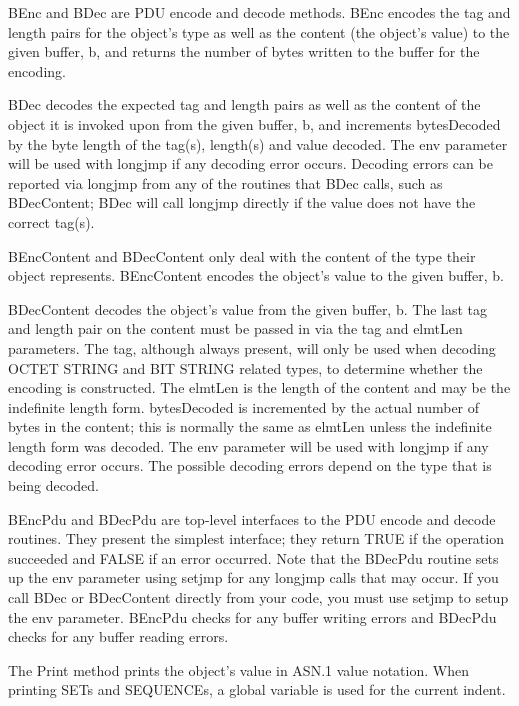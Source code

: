{\C BEnc} and {\C BDec} are PDU encode and decode methods.
{\C BEnc} encodes the tag and length pairs for the object's type as
well as the content (the object's value) to the given buffer,
{\C b}, and returns the number of bytes written to the buffer for
the encoding.

{\C BDec} decodes the expected tag and length pairs as well as the
content of the object it is invoked upon from the given buffer,
{\C b}, and increments {\C bytesDecoded}  by the byte length of
the tag(s), length(s) and value decoded.  The {\C env} parameter
will be used with {\C longjmp} if any decoding error occurs.
Decoding errors can be reported via {\C longjmp} from any of the
routines that {\C BDec} calls, such as {\C BDecContent};
{\C BDec} will call {\C longjmp} directly if the value does not
have the correct tag(s).

{\C BEncContent} and {\C BDecContent} only deal with the content
of the type their object represents.  {\C BEncContent} encodes the
object's value to the given buffer, {\C b}.

{\C BDecContent} decodes the object's value from the given buffer,
{\C b}.  The last tag and length pair on the content must be passed in
via the {\C tag} and {\C elmtLen} parameters.  The {\C tag},
although always present, will only be used when decoding OCTET STRING and
BIT STRING related types, to determine whether the encoding is
constructed.  The {\C elmtLen} is the length of the content and may
be the indefinite length form.  {\C bytesDecoded} is incremented by
the actual number of bytes in the content; this is normally the same
as {\C elmtLen} unless the indefinite length form was decoded.  The
{\C env} parameter will be used with {\C longjmp} if any decoding
error occurs.  The possible decoding errors depend on the type that is
being decoded.

{\C BEncPdu} and {\C BDecPdu} are top-level interfaces to the PDU
encode and decode routines.  They present the simplest interface;
they return TRUE if the operation succeeded and FALSE if an error
occurred.   Note that the {\C BDecPdu} routine sets up the
{\C env} parameter using {\C setjmp} for any {\C longjmp} calls
that may occur.  If you call {\C BDec} or {\C BDecContent}
directly from your code, you must use {\C setjmp} to setup the
{\C env} parameter.  {\C BEncPdu} checks for any buffer writing
errors and {\C BDecPdu} checks for any buffer reading errors.

The {\C Print} method prints the object's value in ASN.1 value
notation.  When printing SETs and SEQUENCEs, a global variable
is used for the current indent.

